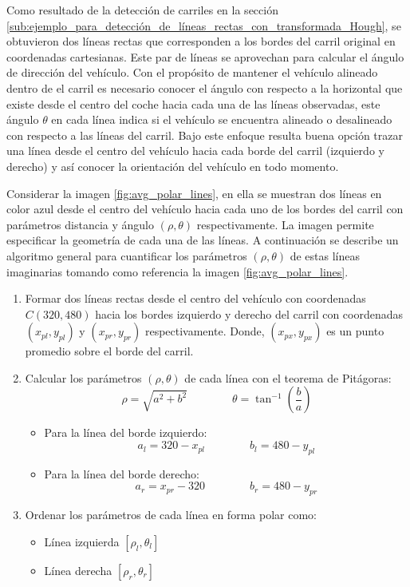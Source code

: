 Como resultado de la detección de carriles en la sección \ref{sub:ejemplo_para_detección_de_líneas_rectas_con_transformada_Hough}, se obtuvieron dos líneas rectas que corresponden a los bordes del carril original en coordenadas cartesianas. Este par de líneas se aprovechan para calcular el ángulo de dirección del vehículo. Con el propósito de mantener el vehículo alineado dentro de el carril es necesario conocer el ángulo con respecto a la horizontal que existe desde el centro del coche hacia cada una de las líneas observadas, este ángulo $\theta$ en cada línea indica si el vehículo se encuentra alineado o desalineado con respecto a las líneas del carril. Bajo este enfoque resulta buena opción trazar una línea desde el centro del vehículo hacia cada borde del carril (izquierdo y derecho) y así conocer la orientación del vehículo en todo momento.

Considerar la imagen \ref{fig:avg_polar_lines}, en ella se muestran dos líneas en color azul desde el centro del vehículo hacia cada uno de los bordes del carril con parámetros distancia y ángulo $(\rho, \theta)$ respectivamente. La imagen permite especificar la geometría de cada una de las líneas. A continuación se describe un algoritmo general para cuantificar los parámetros  $(\rho, \theta)$ de estas líneas imaginarias tomando como referencia la imagen \ref{fig:avg_polar_lines}.

\begin{enumerate}
    \item Formar dos líneas rectas desde el centro del vehículo con coordenadas $C(320, 480)$ hacia los bordes izquierdo y derecho del carril con coordenadas $(x_{pl}, y_{pl})$ y $(x_{pr}, y_{pr})$ respectivamente. Donde, $(x_{px}, y_{px})$ es un punto promedio sobre el borde del carril.
    \item Calcular los parámetros $(\rho, \theta)$ de cada línea con el teorema de Pitágoras:
    \begin{equation}
        \rho = \sqrt{a^2 + b^2}\qquad\qquad\theta = \tan^{-1} \left( \frac{b}{a} \right)
    \end{equation}
    \begin{itemize}
        \item Para la línea del borde izquierdo:
        \begin{equation}
            a_l = 320 - x_{pl}\qquad\qquad b_l = 480 - y_{pl}
        \end{equation}
        \item Para la línea del borde derecho:
        \begin{equation}
            a_r = x_{pr} - 320\qquad\qquad b_r = 480 - y_{pr}
        \end{equation}
    \end{itemize}
    \item Ordenar los parámetros de cada línea en forma polar como:
    \begin{itemize}
        \item Línea izquierda $[\rho_l, \theta_l]$
        \item Línea derecha $[\rho_r, \theta_r]$
    \end{itemize}
\end{enumerate}

